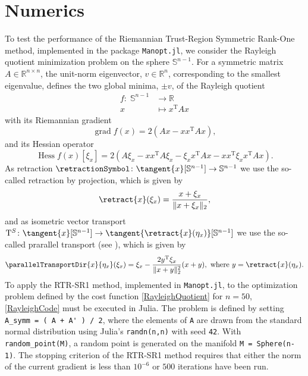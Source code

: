 \chapter{Numerics}

To test the performance of the Riemannian Trust-Region Symmetric Rank-One method, implemented in the package \lstinline!Manopt.jl!, we consider the Rayleigh quotient minimization problem on the sphere $\mathbb{S}^{n-1}$. For a symmetric matrix $A \in \mathbb{R}^{n \times n}$, the unit-norm eigenvector, $v \in \mathbb{R}^n$, corresponding to the smallest eigenvalue, defines the two global minima, $\pm v$, of the Rayleigh quotient  
\begin{equation}\label{RayleighQuotient}
    \begin{split}
        f \colon \; \mathbb{S}^{n-1} & \to \mathbb{R} \\
        x & \mapsto x^{\mathrm{T}} A x 
    \end{split}
\end{equation}   
with its Riemannian gradient 
\begin{equation*}
    \operatorname{grad} f(x) = 2(Ax - x x^{\mathrm{T}} A x),
\end{equation*}
and its Hessian operator
\begin{equation}\label{RayleighHessian}
    \operatorname{Hess} f(x) [\xi_x] = 2 (A \xi_x - x x^{\mathrm{T}} A \xi_x - \xi_x x^{\mathrm{T}} A x - x x^{\mathrm{T}} \xi_x x^{\mathrm{T}} A x).
\end{equation}
As retraction $\retractionSymbol \colon \tangent{x}[\mathbb{S}^{n-1}] \to \mathbb{S}^{n-1}$ we use the so-called retraction by projection, which is given by
\begin{equation*}
    \retract{x}(\xi_x) = \frac{x + \xi_x}{\lVert x + \xi_x \rVert_2},
\end{equation*}
and as isometric vector transport $\mathrm{T}^S \colon \tangent{x}[\mathbb{S}^{n-1}] \to \tangent{\retract{x}(\eta_x)}[\mathbb{S}^{n-1}]$ we use the so-called prarallel transport (see \cite[p.~104]{AbsilMahonySepulchre:2008}), which is given by 
\begin{equation*}
    \parallelTransportDir{x}{\eta_x}(\xi_x) = \xi_x - \frac{2 y^{\mathrm{T}} \xi_x}{\lVert x + y \rVert^{2}_2} (x + y), \text{ where } y = \retract{x}(\eta_x).
\end{equation*}
To apply the RTR-SR1 method, implemented in \lstinline!Manopt.jl!, to the optimization problem defined by the cost function \cref{RayleighQuotient} for $n=50$, \cref{RayleighCode} must be executed in Julia. The problem is defined by setting \lstinline!A_symm = ( A + A' ) / 2!, where the elements of \lstinline!A! are drawn from the standard normal distribution using Julia’s \lstinline!randn(n,n)! with seed \lstinline!42!. With \lstinline!random_point(M)!, a random point is generated on the manifold \lstinline!M = Sphere(n-1)!. The stopping criterion of the RTR-SR1 method requires that either the norm of the current gradient is less than $10^{-6}$ or $500$ iterations have been run. \\
